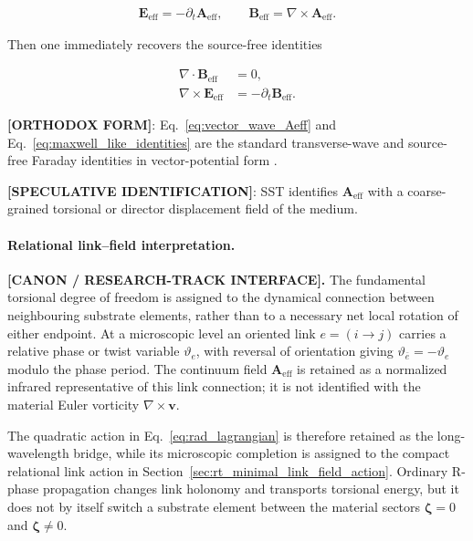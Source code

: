 \documentclass[11pt]{article}
\theoremstyle{definition}
\theoremstyle{plain}
\theoremstyle{remark}
\begin{document}
        \begin{align}
            \mathbf{E}_{\mathrm{eff}} = -\partial_t \mathbf{A}_{\mathrm{eff}},
            \qquad
            \mathbf{B}_{\mathrm{eff}} = \nabla\times \mathbf{A}_{\mathrm{eff}}.
            \label{eq:effective_em_fields}
        \end{align}

        Then one immediately recovers the source-free identities

        \begin{align}
            \nabla\cdot \mathbf{B}_{\mathrm{eff}} &= 0, \\
            \nabla\times \mathbf{E}_{\mathrm{eff}} &= -\partial_t \mathbf{B}_{\mathrm{eff}}.
            \label{eq:maxwell_like_identities}
        \end{align}

        \textbf{[ORTHODOX FORM]}: Eq.~\eqref{eq:vector_wave_Aeff} and Eq.~\eqref{eq:maxwell_like_identities} are the standard transverse-wave and source-free Faraday identities in vector-potential form \cite{Jackson1999}.

        \textbf{[SPECULATIVE IDENTIFICATION]}: SST identifies $\mathbf{A}_{\mathrm{eff}}$ with a coarse-grained torsional or director displacement field of the medium.


        \paragraph{Relational link--field interpretation.}
        \textbf{[CANON / RESEARCH-TRACK INTERFACE].}
        The fundamental torsional degree of freedom is assigned to the dynamical
        connection between neighbouring substrate elements, rather than to a
        necessary net local rotation of either endpoint.  At a microscopic level
        an oriented link $e=(i\!\to\!j)$ carries a relative phase or twist variable
        $\vartheta_e$, with reversal of orientation giving
        $\vartheta_{\bar e}=-\vartheta_e$ modulo the phase period.  The continuum
        field $\mathbf A_{\mathrm{eff}}$ is retained as a normalized infrared
        representative of this link connection; it is not identified with the
        material Euler vorticity $\nabla\times\mathbf v$.

        The quadratic action in Eq.~\eqref{eq:rad_lagrangian} is therefore retained
        as the long-wavelength bridge, while its microscopic completion is assigned
        to the compact relational link action in
        Section~\ref{sec:rt_minimal_link_field_action}.  Ordinary R-phase
        propagation changes link holonomy and transports torsional energy, but it
        does not by itself switch a substrate element between the material sectors
        $\boldsymbol\zeta=0$ and $\boldsymbol\zeta\neq0$.
\end{document}
